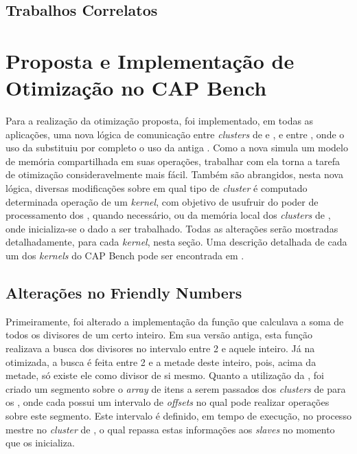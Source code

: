 \documentclass[a4paper,11pt]{article}
\newcommand{\capb}{CAP Bench\xspace}
\begin{document}

\subsection{Trabalhos Correlatos}

\section{Proposta e Implementação de Otimização no \capb}
\label{sec:capbMPPA}

Para a realização da otimização proposta, foi implementado, em todas as aplicações, uma nova lógica de comunicação entre \textit{clusters} de \io e \ccs, e entre \ccs, onde o uso da \async substituiu por completo o uso da antiga \ipc. Como a nova \api simula um modelo de memória compartilhada em suas operações, trabalhar com ela torna a tarefa de otimização consideravelmente mais fácil. Também são abrangidos, nesta nova lógica, diversas modificações sobre em qual tipo de \textit{cluster} é computado determinada operação de um \textit{kernel}, com objetivo de usufruir do poder de processamento dos \ccs, quando necessário, ou da memória local dos \textit{clusters} de \io, onde inicializa-se o dado a ser trabalhado. Todas as alterações serão mostradas detalhadamente, para cada \textit{kernel}, nesta seção. Uma descrição detalhada de cada um dos \textit{kernels} do \capb pode ser encontrada em \cite{Castro-Souza-CCPE:2016}.

\subsection{Alterações no Friendly Numbers}

Primeiramente, foi alterado a implementação da função que calculava a soma de todos os divisores de um certo inteiro. Em sua versão antiga, esta função realizava a busca dos divisores no intervalo entre 2 e aquele inteiro. Já na otimizada, a busca é feita entre 2 e a metade deste inteiro, pois, acima da metade, só existe ele como divisor de si mesmo. Quanto a utilização da \async, foi criado um segmento sobre o \textit{array} de itens a serem passados dos \textit{clusters} de \io para os \ccs, onde cada \cc possui um intervalo de \textit{offsets} no qual pode realizar operações sobre este segmento. Este intervalo é definido, em tempo de execução, no processo mestre no \textit{cluster} de \io, o qual repassa estas informações aos \textit{slaves} no momento que os inicializa.
\end{document}
